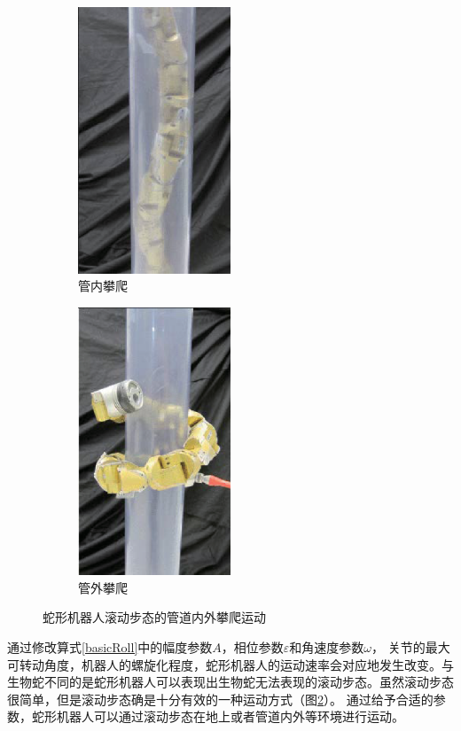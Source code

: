 \begin{figure}[htbp] %
	\begin{subfigure}{0.5\textwidth}
		\centering
		\includegraphics[width=0.5\textwidth]{figure/chap03/pipecrawl.eps}
		\caption{管内攀爬}
		\label{fig:pipecrawl}
	\end{subfigure}
	\begin{subfigure}{0.5\textwidth}
		\centering
		\includegraphics[width=0.5\textwidth]{figure/chap03/poleclimb.eps}
		\caption{管外攀爬}
		\label{fig:poleclimb}
	\end{subfigure}
	\caption{蛇形机器人滚动步态的管道内外攀爬运动}
	\label{fig:polecc}
\end{figure}

通过修改算式\ref{basicRoll}中的幅度参数$A$，相位参数$\varepsilon$和角速度参数$\omega$， 关节的最大可转动角度，机器人的螺旋化程度，蛇形机器人的运动速率会对应地发生改变。与生物蛇不同的是蛇形机器人可以表现出生物蛇无法表现的滚动步态。虽然滚动步态很简单，但是滚动步态确是十分有效的一种运动方式（图\ref{fig:poleclimb}）。 通过给予合适的参数，蛇形机器人可以通过滚动步态在地上或者管道内外等环境进行运动。
